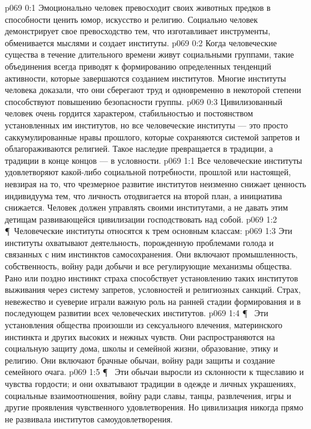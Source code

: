 \author{Мелхиседек}
\vs p069 0:1 Эмоционально человек превосходит своих животных предков в способности ценить юмор, искусство и религию. Социально человек демонстрирует свое превосходство тем, что изготавливает инструменты, обменивается мыслями и создает институты.
\vs p069 0:2 Когда человеческие существа в течение длительного времени живут социальными группами, такие объединения всегда приводят к формированию определенных тенденций активности, которые завершаются созданием институтов. Многие институты человека доказали, что они сберегают труд и одновременно в некоторой степени способствуют повышению безопасности группы.
\vs p069 0:3 Цивилизованный человек очень гордится характером, стабильностью и постоянством установленных им институтов, но все человеческие институты --- это просто саккумулированные нравы прошлого, которые сохраняются системой запретов и облагораживаются религией. Такое наследие превращается в традиции, а традиции в конце концов --- в условности.
\vs p069 1:1 Все человеческие институты удовлетворяют какой\hyp{}либо социальной потребности, прошлой или настоящей, невзирая на то, что чрезмерное развитие институтов неизменно снижает ценность индивидуума тем, что личность отодвигается на второй план, а инициатива снижается. Человек должен управлять своими институтами, а не давать этим детищам развивающейся цивилизации господствовать над собой.
\vs p069 1:2 \P\ Человеческие институты относятся к трем основным классам:
\vs p069 1:3 \bibnobreakspace {} Эти институты охватывают деятельность, порожденную проблемами голода и связанных с ним инстинктов самосохранения. Они включают промышленность, собственность, войну ради добычи и все регулирующие механизмы общества. Рано или поздно инстинкт страха способствует установлению таких институтов выживания через систему запретов, условностей и религиозных санкций. Страх, невежество и суеверие играли важную роль на ранней стадии формирования и в последующем развитии всех человеческих институтов.
\vs p069 1:4 \P\ \bibnobreakspace {} Эти установления общества произошли из сексуального влечения, материнского инстинкта и других высоких и нежных чувств. Они распространяются на социальную защиту дома, школы и семейной жизни, образование, этику и религию. Они включают брачные обычаи, войну ради защиты и создание семейного очага.
\vs p069 1:5 \P\ \bibnobreakspace {} Эти обычаи выросли из склонности к тщеславию и чувства гордости; и они охватывают традиции в одежде и личных украшениях, социальные взаимоотношения, войну ради славы, танцы, развлечения, игры и другие проявления чувственного удовлетворения. Но цивилизация никогда прямо не развивала институтов самоудовлетворения.
